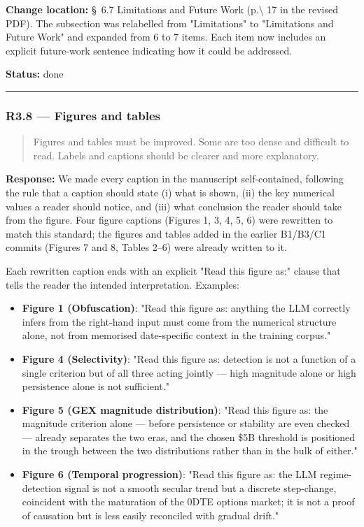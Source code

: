 \documentclass[11pt,a4paper]{article}
\begin{document}
\textbf{Change location:} \S{}~6.7 Limitations and Future Work (p.\textbackslash{} 17 in the
revised PDF). The subsection was relabelled from "Limitations" to
"Limitations and Future Work" and expanded from 6 to 7 items. Each item
now includes an explicit future-work sentence indicating how it could
be addressed.

\textbf{Status:} done

\bigskip\hrule\bigskip

\subsubsection*{R3.8 --- Figures and tables}

\begin{quote}
Figures and tables must be improved. Some are too dense and difficult to read. Labels and captions should be clearer and more explanatory.
\end{quote}

\textbf{Response:} We made every caption in the manuscript self-contained,
following the rule that a caption should state (i) what is shown,
(ii) the key numerical values a reader should notice, and (iii) what
conclusion the reader should take from the figure. Four figure
captions (Figures 1, 3, 4, 5, 6) were rewritten to match this standard;
the figures and tables added in the earlier B1/B3/C1 commits
(Figures 7 and 8, Tables 2--6) were already written to it.

Each rewritten caption ends with an explicit "Read this figure as:"
clause that tells the reader the intended interpretation. Examples:

\begin{itemize}
\item \textbf{Figure 1 (Obfuscation)}: "Read this figure as: anything the LLM correctly infers from the right-hand input must come from the numerical structure alone, not from memorised date-specific context in the training corpus."
\item \textbf{Figure 4 (Selectivity)}: "Read this figure as: detection is not a function of a single criterion but of all three acting jointly --- high magnitude alone or high persistence alone is not sufficient."
\item \textbf{Figure 5 (GEX magnitude distribution)}: "Read this figure as: the magnitude criterion alone --- before persistence or stability are even checked --- already separates the two eras, and the chosen \$5B threshold is positioned in the trough between the two distributions rather than in the bulk of either."
\item \textbf{Figure 6 (Temporal progression)}: "Read this figure as: the LLM regime-detection signal is not a smooth secular trend but a discrete step-change, coincident with the maturation of the 0DTE options market; it is not a proof of causation but is less easily reconciled with gradual drift."
\end{itemize}
\end{document}
